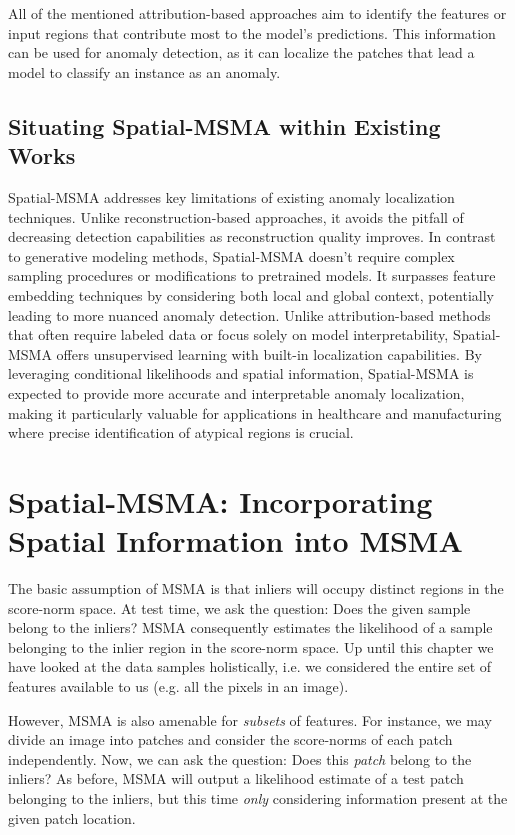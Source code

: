 All of the mentioned attribution-based approaches aim to identify the features or input regions that contribute most to the model's predictions. This information can be used for anomaly detection, as it can localize the patches that lead a model to classify an instance as an anomaly.

\subsection*{Situating Spatial-MSMA within Existing Works}
Spatial-MSMA addresses key limitations of existing anomaly localization techniques. Unlike reconstruction-based approaches, it avoids the pitfall of decreasing detection capabilities as reconstruction quality improves. In contrast to generative modeling methods, Spatial-MSMA doesn't require complex sampling procedures or modifications to pretrained models. It surpasses feature embedding techniques by considering both local and global context, potentially leading to more nuanced anomaly detection. Unlike attribution-based methods that often require labeled data or focus solely on model interpretability, Spatial-MSMA offers unsupervised learning with built-in localization capabilities. By leveraging conditional likelihoods and spatial information, Spatial-MSMA is expected to provide more accurate and interpretable anomaly localization, making it particularly valuable for applications in healthcare and manufacturing where precise identification of atypical regions is crucial.

\section{Spatial-MSMA: Incorporating Spatial Information into MSMA}
The basic assumption of MSMA is that inliers will occupy distinct regions in the score-norm space. At test time, we ask the question: Does the given sample belong to the inliers? MSMA consequently estimates the likelihood of a sample belonging to the inlier region in the score-norm space. Up until this chapter we have looked at the data samples holistically, i.e. we considered the entire set of features available to us (e.g. all the pixels in an image). 

However, MSMA is also amenable for \textit{subsets} of features. For instance, we may divide an image into patches and consider the score-norms of each patch independently. Now, we can ask the question: Does this \textit{patch} belong to the inliers? As before, MSMA will output a likelihood estimate of a test patch belonging to the inliers, but this time \textit{only} considering information present at the given patch location.

